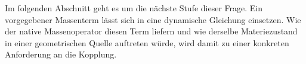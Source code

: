 Im folgenden Abschnitt geht es um die nächste Stufe dieser
Frage. Ein vorgegebener Massenterm lässt sich in eine
dynamische Gleichung einsetzen. Wie der native Massenoperator
diesen Term liefern und wie derselbe Materiezustand in einer
geometrischen Quelle auftreten würde, wird damit zu einer
konkreten Anforderung an die Kopplung.
